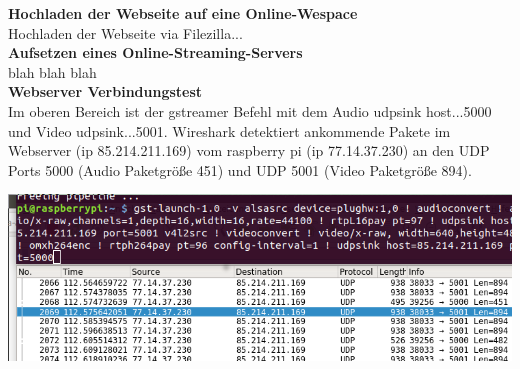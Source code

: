 \textbf{Hochladen der Webseite auf eine Online-Wespace}\\

Hochladen der Webseite via Filezilla...\\

\textbf{Aufsetzen eines Online-Streaming-Servers}\\
blah blah blah\\

\textbf{Webserver Verbindungstest}\\
Im oberen Bereich ist der gstreamer Befehl mit dem Audio udpsink host...5000 und Video udpsink...5001. Wireshark detektiert ankommende Pakete im Webserver (ip 85.214.211.169) vom raspberry pi (ip 77.14.37.230) an den UDP Ports 5000 (Audio Paketgröße 451) und UDP 5001 (Video Paketgröße 894).\\

\begin{minipage}{\textwidth}
    \begin{center}
        \includegraphics[scale=0.85]{img/wireshark.png} 
    \end{center}
\end{minipage}
